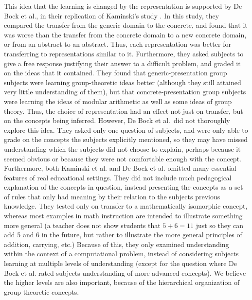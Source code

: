 \documentclass[11pt]{article}
\begin{document}
This idea that the learning is changed by the representation is supported by De Bock et al., in their replication of Kaminski's study \cite{DeBock2011}. In this study, they compared the transfer from the generic domain to the concrete, and found that it was worse than the transfer from the concrete domain to a new concrete domain, or from an abstract to an abstract. Thus, each representation was better for transferring to representations similar to it. Furthermore, they asked subjects to give a free response justifying their answer to a difficult problem, and graded it on the ideas that it contained. They found that generic-presentation group subjects were learning group-theoretic ideas better (although they still attained very little understanding of them), but that concrete-presentation group subjects were learning the ideas of modular arithmetic as well as some ideas of group theory. Thus, the choice of representation had an effect not just on transfer, but on the concepts being inferred. However, De Bock et al.\ did not thoroughly explore this idea. They asked only one question of subjects, and were only able to grade on the concepts the subjects explicitly mentioned, so they may have missed understanding which the subjects did not choose to explain, perhaps because it seemed obvious or because they were not comfortable enough with the concept.\\[11pt]
Furthermore, both Kaminski et al. and De Bock et al. omitted many essential features of real educational settings. They did not include much pedagogical explanation of the concepts in question, instead presenting the concepts as a set of rules that only had meaning by their relation to the subjects previous knowledge. They tested only on transfer to a mathematically isomorphic concept, whereas most examples in math instruction are intended to illustrate something more general (a teacher does not show students that $5+6 = 11$ just so they can add 5 and 6 in the future, but rather to illustrate the more general principles of addition, carrying, etc.) Because of this, they only examined understanding within the context of a computational problem, instead of considering subjects learning at multiple levels of understanding (except for the question where De Bock et al. rated subjects understanding of more advanced concepts). We believe the higher levels are also important, because of the hierarchical organization of group theoretic concepts. 
\end{document}
